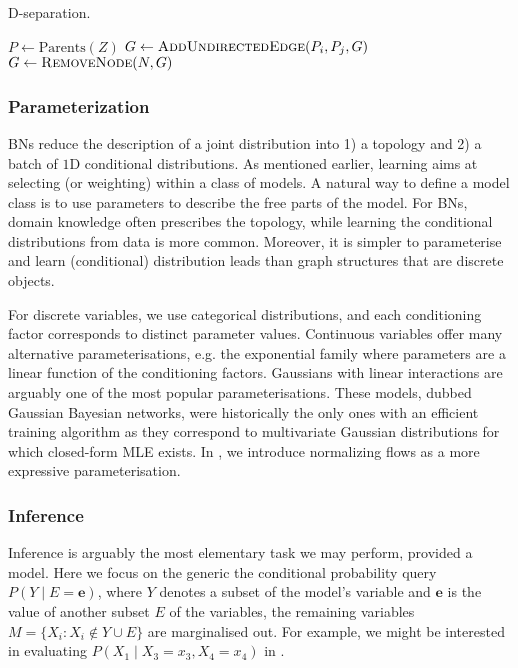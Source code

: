 \begin{algorithm}
\caption{D-separation.}\label{alg:d-separation}
  \begin{algorithmic}
      \State {}
        \State $P \gets \text{Parents}(Z)$ 
          \State $G \gets \Call{AddUndirectedEdge}{P_i, P_j, G}$
        \EndFor
        \State $G \gets \Call{RemoveNode}{N, G}$
      \EndFor
      \State {}
    \EndFunction
   \end{algorithmic}
\end{algorithm}

\subsubsection{Parameterization}
BNs reduce the description of a joint distribution into 1) a topology and 2) a batch of $1$D conditional distributions. As mentioned earlier, learning aims at selecting (or weighting) within a class of models. A natural way to define a model class is to use parameters to describe the free parts of the model. For BNs, domain knowledge often prescribes the topology, while learning the conditional distributions from data is more common. Moreover, it is simpler to parameterise and learn (conditional) distribution leads than graph structures that are discrete objects.

For discrete variables, we use categorical distributions, and each conditioning factor corresponds to distinct parameter values. Continuous variables offer many alternative parameterisations, e.g. the exponential family where parameters are a linear function of the conditioning factors. Gaussians with linear interactions are arguably one of the most popular parameterisations. These models, dubbed Gaussian Bayesian networks, were historically the only ones with an efficient training algorithm as they correspond to multivariate Gaussian distributions \citep{wermuth1980linear} for which closed-form MLE exists. In , we introduce normalizing flows as a more expressive parameterisation.
\subsubsection{Inference}
Inference is arguably the most elementary task we may perform, provided a model. Here we focus on the generic the conditional probability query $P(Y\mid E=\bm{e})$, where $Y$ denotes a subset of the model's variable and $\bm{e}$ is the value of another subset $E$ of the variables, the remaining variables $M = \{X_i: X_i \notin Y \cup E \}$ are marginalised out. For example, we might be interested in evaluating $P(X_1\mid X_3=x_3, X_4=x_4)$ in .


